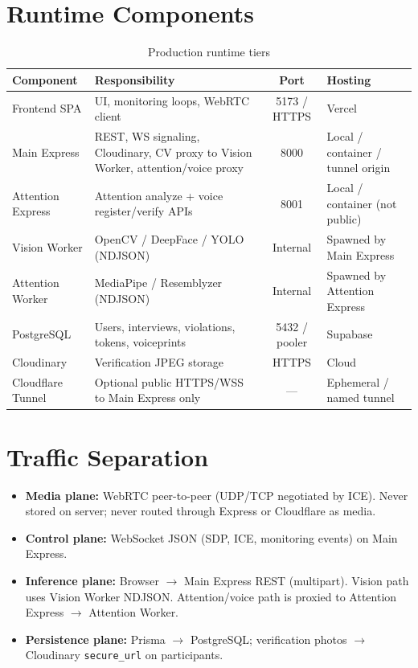 \documentclass[11pt,a4paper]{report}
\begin{document}
\section{Runtime Components}

\begin{table}[H]
\centering
\caption{Production runtime tiers}
\small
\begin{tabularx}{\textwidth}{@{}lXcl@{}}
\toprule
\textbf{Component} & \textbf{Responsibility} & \textbf{Port} & \textbf{Hosting} \\
\midrule
Frontend SPA & UI, monitoring loops, WebRTC client & 5173 / HTTPS & Vercel \\
Main Express & REST, WS signaling, Cloudinary, CV proxy to Vision Worker, attention/voice proxy & 8000 & Local / container / tunnel origin \\
Attention Express & Attention analyze + voice register/verify APIs & 8001 & Local / container (not public) \\
Vision Worker & OpenCV / DeepFace / YOLO (NDJSON) & Internal & Spawned by Main Express \\
Attention Worker & MediaPipe / Resemblyzer (NDJSON) & Internal & Spawned by Attention Express \\
PostgreSQL & Users, interviews, violations, tokens, voiceprints & 5432 / pooler & Supabase \\
Cloudinary & Verification JPEG storage & HTTPS & Cloud \\
Cloudflare Tunnel & Optional public HTTPS/WSS to Main Express only & --- & Ephemeral / named tunnel \\
\bottomrule
\end{tabularx}
\end{table}

\section{Traffic Separation}
\begin{itemize}
  \item \textbf{Media plane:} WebRTC peer-to-peer (UDP/TCP negotiated by ICE). Never stored on server; never routed through Express or Cloudflare as media.
  \item \textbf{Control plane:} WebSocket JSON (SDP, ICE, monitoring events) on Main Express.
  \item \textbf{Inference plane:} Browser $\rightarrow$ Main Express REST (multipart). Vision path uses Vision Worker NDJSON. Attention/voice path is proxied to Attention Express $\rightarrow$ Attention Worker.
  \item \textbf{Persistence plane:} Prisma $\rightarrow$ PostgreSQL; verification photos $\rightarrow$ Cloudinary \texttt{secure\_url} on participants.
\end{itemize}
\end{document}
